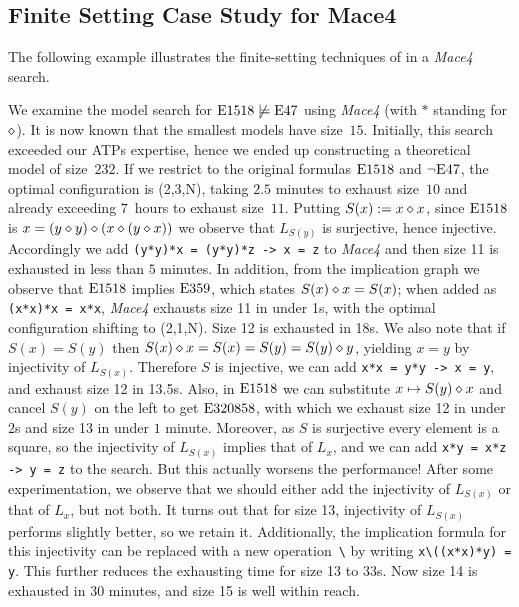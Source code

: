 \subsection{Finite Setting Case Study for Mace4}
The following example illustrates the finite-setting techniques of  in a \emph{Mace4} search.
\begin{example}\label{atp-case-study}
We examine the model search for $\mathrm{E}1518\not\models\mathrm{E}47$ using \emph{Mace4} (with $*$ standing for $\diamond$). It is now known that the smallest models have size~$15$. Initially, this search exceeded our ATPs expertise, hence we ended up constructing a theoretical model of size~$232$. If we restrict to the original formulas $\mathrm{E}1518$ and $\neg\mathrm{E}47$, the optimal configuration is (2,3,N), taking $2.5$ minutes to exhaust size~$10$ and already exceeding $7$~hours to exhaust size~$11$. Putting $S(x):=x\diamond x$, since $\mathrm{E}1518$ is $x = (y \diamond y) \diamond  (x \diamond  (y \diamond  x))$ we observe that $L_{S(y)}$ is surjective, hence injective. Accordingly we add \verb|(y*y)*x = (y*y)*z -> x = z| to \emph{Mace4} and then size 11 is exhausted in less than $5$ minutes. In addition, from the implication graph we observe that $\mathrm{E}1518$ implies $\mathrm{E}359$, which states $S(x) \diamond x = S(x)$; when added as \verb|(x*x)*x = x*x|, \emph{Mace4} exhausts size 11 in under 1s, with the optimal configuration shifting to (2,1,N). Size 12 is exhausted in 18s. We also note that if $S(x)=S(y)$ then $S(x)\diamond x = S(x) = S(y) = S(y)\diamond y$, yielding $x=y$ by injectivity of $L_{S(x)}$. Therefore $S$ is injective, we can add \verb|x*x = y*y -> x = y|, and exhaust size 12 in 13.5s. Also, in $\mathrm{E}1518$ we can substitute $x\mapsto S(y)\diamond x$ and cancel $S(y)$ on the left to get $\mathrm{E}320858$, with which we exhaust size 12 in under $2$s and size 13 in under $1$ minute. Moreover, as $S$ is surjective every element is a square, so the injectivity of $L_{S(x)}$ implies that of $L_x$, and we can add \verb|x*y = x*z -> y = z| to the search. But this actually worsens the performance! After some experimentation, we observe that we should either add the injectivity of $L_{S(x)}$ or that of $L_x$, but not both. It turns out that for size 13, injectivity of $L_{S(x)}$ performs slightly better, so we retain it. Additionally, the implication formula for this injectivity can be replaced with a new operation~\texttt{\textbackslash} by writing \texttt{x\textbackslash((x*x)*y) = y}. This further reduces the exhausting time for size 13 to $33$s. Now size 14 is exhausted in 30 minutes, and size 15 is well within reach.
\end{example}


